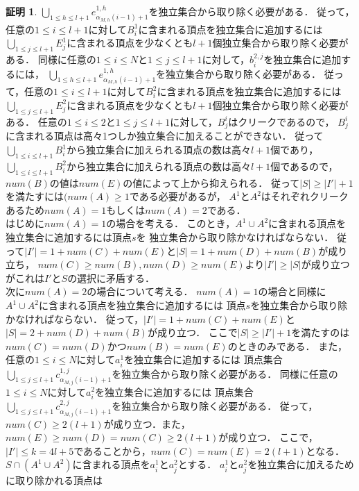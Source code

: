 \documentclass[12pt]{thesis}
\theoremstyle{definition}
\newtheorem*{prf*}{証明}
\begin{document}
\begin{prf*}
$\bigcup_{1\leq h \leq l+1} e^{1,h}_{\alpha_{M,h}(i-1)+1}$を独立集合から取り除く必要がある．
従って，任意の$1\leq i \leq l+1$に対して$B^{1}_{i}$に含まれる頂点を独立集合に追加するには
$\bigcup_{1\leq j \leq l+1}E^{1}_{j}$に含まれる頂点を少なくとも$l+1$個独立集合から取り除く必要がある．
同様に任意の$1\leq i \leq N$と$1\leq j \leq l+1$に対して，$b^{2,j}_{i}$を独立集合に追加するには，
$\bigcup_{1\leq h \leq l+1} e^{1,h}_{\alpha_{M,h}(i-1)+1}$を独立集合から取り除く必要がある．
従って，任意の$1\leq i \leq l+1$に対して$B^{2}_{i}$に含まれる頂点を独立集合に追加するには
$\bigcup_{1\leq j \leq l+1}E^{2}_{j}$に含まれる頂点を少なくとも$l+1$個独立集合から取り除く必要がある．
任意の$1\leq i \leq 2$と$1\leq j \leq l+1$に対して，$B^{i}_{j}$はクリークであるので，
$B^{i}_{j}$に含まれる頂点は高々1つしか独立集合に加えることができない．
従って$\bigcup_{1\leq i \leq l+1}B^{1}_{i}$から独立集合に加えられる頂点の数は高々$l+1$個であり，
$\bigcup_{1\leq i \leq l+1}B^{2}_{i}$から独立集合に加えられる頂点の数は高々$l+1$個であるので，
$num(B)$の値は$num(E)$の値によって上から抑えられる．
従って$|S|\geq |I'|+1$を満たすには$(num(A) \geq 1$である必要があるが，
$A^{1}$と$A^{2}$はそれぞれクリークあるため$num(A) = 1$もしくは$num(A) = 2$である．\\
はじめに$num(A)=1$の場合を考える．
このとき，$A^{1} \cup A^{2}$に含まれる頂点を独立集合に追加するには頂点$s$を
独立集合から取り除かなければならない．
従って$|I'|=1+num(C)+num(E)$と$|S|=1+num(D)+num(B)$が成り立ち，
$num(C)\geq num(B), num(D)\geq num(E)$より$|I'|\geq |S|$が成り立つがこれは$I'$と$S$の選択に矛盾する．\\
次に$num(A)=2$の場合について考える．
$num(A)=1$の場合と同様に$A^{1} \cup A^{2}$に含まれる頂点を独立集合に追加するには
頂点$s$を独立集合から取り除かなければならない．
従って，$|I'|=1+num(C)+num(E)$と$|S|=2+num(D)+num(B)$が成り立つ．
ここで$|S| \geq |I'|+1$を満たすのは$num(C)=num(D)$かつ$num(B)=num(E)$のときのみである．
また，任意の$1\leq i \leq N$に対して$a^{1}_{i}$を独立集合に追加するには
頂点集合$\bigcup_{1\leq j \leq l+1} c^{1,j}_{\alpha_{M,j}(i-1)+1}$を独立集合から取り除く必要がある．
同様に任意の$1\leq i \leq N$に対して$a^{2}_{i}$を独立集合に追加するには
頂点集合$\bigcup_{1\leq j \leq l+1} c^{2,j}_{\alpha_{M,j}(i-1)+1}$を独立集合から取り除く必要がある．
従って，$num(C) \geq 2 (l+1)$が成り立つ．また，$num(E)\geq num(D)=num(C) \geq 2(l+1)$が成り立つ．
ここで，$|I'|\leq k=4l+5$であることから，$num(C)=num(E)=2(l+1)$となる． \\
$S \cap (A^{1}\cup A^{2})$に含まれる頂点を$a^{1}_{i}$と$a^{2}_{j}$とする．
$a^{1}_{i}$と$a^{2}_{j}$を独立集合に加えるために取り除かれる頂点は

\end{prf*}
\end{document}
